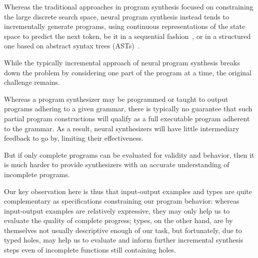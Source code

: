 \documentclass{article}
\begin{document}



Whereas the traditional approaches in program synthesis focused on constraining the large discrete search space,
neural program synthesis instead tends to incrementally generate programs,
using continuous representations of the state space to predict the next token,
be it in a sequential fashion~\citep{alphanpi},
or in a structured one based on abstract syntax trees (ASTs)~\citep{nsps}.

While the typically incremental approach of neural program synthesis breaks down the problem by considering one part of the program at a time, the original challenge remains.

Whereas a program synthesizer may be programmed or taught to output programs adhering to a given grammar,
there is typically no guarantee that such partial program constructions will qualify as a full executable program adherent to the grammar.
As a result, neural synthesizers will have little intermediary feedback to go by, limiting their effectiveness.

But if only complete programs can be evaluated for validity and behavior, then 
it is much harder to provide synthesizers with an accurate understanding of incomplete programs.

Our key observation here is thus that input-output examples and types are quite complementary as specifications constraining our program behavior:
whereas input-output examples are relatively expressive, they may only help us to evaluate the quality of complete progress;
types, on the other hand, are by themselves not usually descriptive enough of our task,
but fortunately, due to typed holes,
may help us to evaluate and inform further incremental synthesis steps even of incomplete functions still containing holes.
\end{document}
